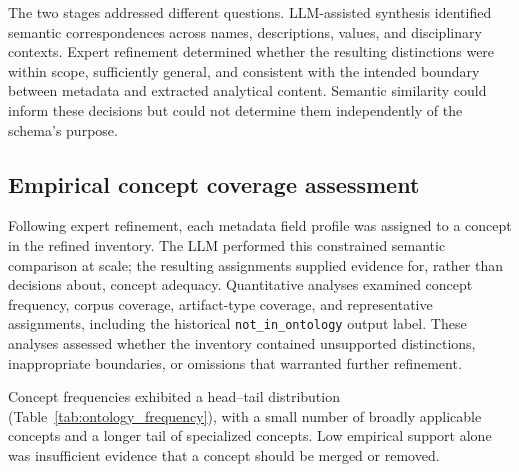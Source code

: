 \documentclass{article}
\begin{document}
The two stages addressed different questions. LLM-assisted synthesis identified semantic correspondences across names, descriptions, values, and disciplinary contexts. Expert refinement determined whether the resulting distinctions were within scope, sufficiently general, and consistent with the intended boundary between metadata and extracted analytical content. Semantic similarity could inform these decisions but could not determine them independently of the schema's purpose.

\subsection{Empirical concept coverage assessment}
\label{sec:validation}

Following expert refinement, each metadata field profile was assigned to a concept in the refined inventory. The LLM performed this constrained semantic comparison at scale; the resulting assignments supplied evidence for, rather than decisions about, concept adequacy. Quantitative analyses examined concept frequency, corpus coverage, artifact-type coverage, and representative assignments, including the historical \texttt{not\_in\_ontology} output label. These analyses assessed whether the inventory contained unsupported distinctions, inappropriate boundaries, or omissions that warranted further refinement.

Concept frequencies exhibited a head--tail distribution (Table~\ref{tab:ontology_frequency}), with a small number of broadly applicable concepts and a longer tail of specialized concepts. Low empirical support alone was insufficient evidence that a concept should be merged or removed.
\end{document}
